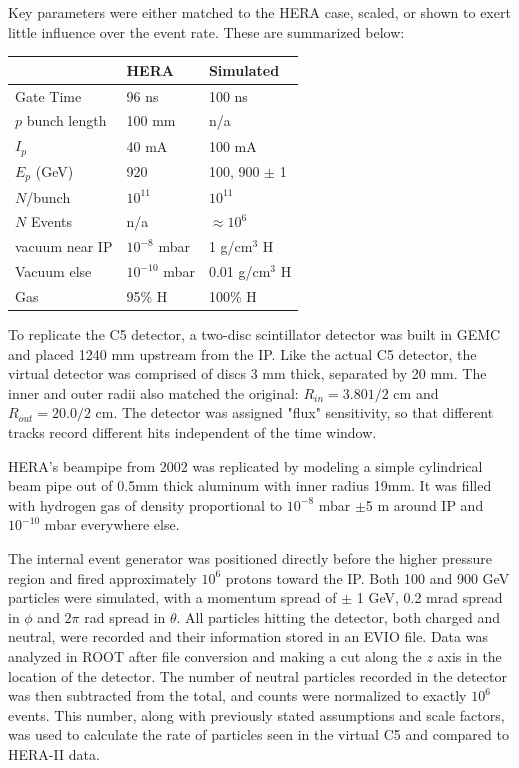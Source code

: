 Key parameters were either matched to the HERA case, scaled, or shown to exert little influence over the event rate.  These are summarized below:
\begin{center}
	\begin{tabular}{ l l l } 
		   & HERA & Simulated \\ 
		\hline \hline
		Gate Time & 96 ns & 100 ns \\ 
		$p$ bunch length & 100 mm & n/a \\ 
		$I_p$ & 40 mA & 100 mA\\
		$E_p$ (GeV)& 920 & 100, 900 $\pm$ 1 \\
		$N$/bunch & $10^{11}$ & $10^{11}$\\
		$N$ Events & n/a & $\approx 10^6$\\
		vacuum near IP& $10^{-8}$ mbar  & 1 g/cm$^3$ H \\
		Vacuum else& $10^{-10}$ mbar & 0.01 g/cm$^3$ H\\
		Gas & 95\% H & 100\% H\\
		\hline
	\end{tabular}
\end{center}


To replicate the C5 detector, a two-disc scintillator detector was built in GEMC and placed 1240 mm upstream from the IP.  Like the actual C5 detector, the virtual detector was comprised of discs 3 mm thick, separated by 20 mm.  The inner and outer radii also matched the original: $R_{in} = 3.801/2$ cm and $R_{out} = 20.0/2$ cm.  The detector was assigned "flux" sensitivity, so that different tracks record different hits independent of the time window. 

HERA's beampipe from 2002 was replicated by modeling a simple cylindrical beam pipe out of 0.5mm thick aluminum with inner radius 19mm.  It was filled with hydrogen gas of density proportional to  $10^{-8}$ mbar $\pm$5 m around IP and $10^{-10}$ mbar everywhere else.

The internal event generator was positioned directly before the higher pressure region and fired approximately $10^6$ protons toward the IP.  Both 100 and 900 GeV particles were simulated, with a momentum spread of $\pm$ 1 GeV, 0.2 mrad spread in $\phi$ and $2\pi$ rad spread in $\theta$.  All particles hitting the detector, both charged and neutral, were recorded and their information stored in an EVIO file.  Data was analyzed in ROOT after file conversion and making a cut along the $z$ axis in the location of the detector.  The number of neutral particles recorded in the detector was then subtracted from the total, and counts were normalized to exactly $10^6$ events.  This number, along with previously stated assumptions and scale factors, was used to calculate the rate of particles seen in the virtual C5 and compared to HERA-II data.

